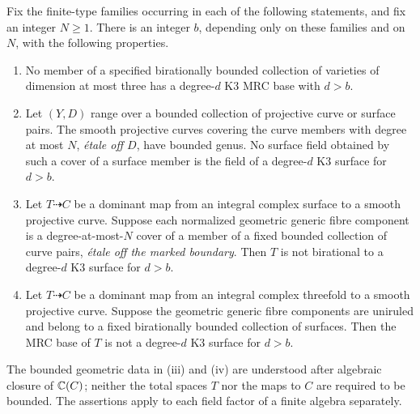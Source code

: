 \begin{theorem}
\label{bd:exclusions}
Fix the finite-type families occurring in each of the following
statements, and fix an integer $N\geq1$.  There is an integer $b$,
depending only on these families and on $N$, with the following
properties.
\begin{enumerate}[label=\textup{(\roman*)}]
\item No member of a specified birationally bounded collection of
varieties of dimension at most three has a degree-$d$ K3 MRC base with
$d>b$.
\item Let $(Y,D)$ range over a bounded collection of projective curve
or surface pairs.  The smooth projective curves covering the curve
members with degree at most $N$, \emph{\'etale off $D$}, have bounded
genus.  No surface field obtained by such a cover of a surface member is
the field of a degree-$d$ K3 surface for $d>b$.
\item Let $T\dashrightarrow C$ be a dominant map from an integral
complex surface to a smooth projective curve.  Suppose each normalized
geometric generic fibre component is a degree-at-most-$N$ cover of a
member of a fixed bounded collection of curve pairs, \emph{\'etale off
the marked boundary}.  Then $T$ is not birational to a degree-$d$ K3
surface for $d>b$.
\item Let $T\dashrightarrow C$ be a dominant map from an integral
complex threefold to a smooth projective curve.  Suppose the geometric
generic fibre components are uniruled and belong to a fixed
birationally bounded collection of surfaces.  Then the MRC base of
$T$ is not a degree-$d$ K3 surface for $d>b$.
\end{enumerate}
The bounded geometric data in \textup{(iii)} and \textup{(iv)} are
understood after algebraic closure of $\mathbb C(C)$; neither the total spaces
$T$ nor the maps to $C$ are required to be bounded.  The assertions
apply to each field factor of a finite algebra separately.
\end{theorem}

